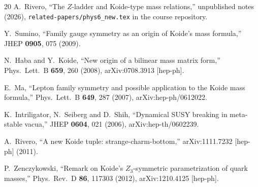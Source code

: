 \documentclass[11pt,a4paper]{article}
\begin{document}
\begin{thebibliography}{20}
A.~Rivero,
``The $Z$-ladder and Koide-type mass relations,''
unpublished notes (2026), \texttt{related-papers/phys6\_new.tex}
in the course repository.

Y.~Sumino,
``Family gauge symmetry as an origin of Koide's mass formula,''
JHEP \textbf{0905}, 075 (2009).

N.~Haba and Y.~Koide,
``New origin of a bilinear mass matrix form,''
Phys.\ Lett.\ B \textbf{659}, 260 (2008),
arXiv:0708.3913 [hep-ph].

E.~Ma,
``Lepton family symmetry and possible application to the Koide mass formula,''
Phys.\ Lett.\ B \textbf{649}, 287 (2007),
arXiv:hep-ph/0612022.

K.~Intriligator, N.~Seiberg and D.~Shih,
``Dynamical SUSY breaking in meta-stable vacua,''
JHEP \textbf{0604}, 021 (2006),
arXiv:hep-th/0602239.

A.~Rivero,
``A new Koide tuple: strange-charm-bottom,''
arXiv:1111.7232 [hep-ph] (2011).

P.~Zenczykowski,
``Remark on Koide's $Z_3$-symmetric parametrization of
quark masses,''
Phys.\ Rev.\ D \textbf{86}, 117303 (2012),
arXiv:1210.4125 [hep-ph].

\end{thebibliography}
\end{document}
